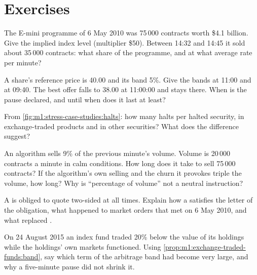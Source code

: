 \section{Exercises}

\begin{exercise}[$\star$]\label{exo:m1:stress-case-studies:1}
The E-mini programme of 6 May 2010 was 75\,000 contracts worth \$4.1 billion.
Give the implied index level (multiplier \$50). Between 14:32 and 14:45 it sold
about 35\,000 contracts: what share of the programme, and at what average
rate per minute?
\end{exercise}

\begin{exercise}[$\star$]\label{exo:m1:stress-case-studies:2}
A share's reference price is 40.00 and its band 5\%. Give the bands at 11:00
and at 09:40. The best offer falls to 38.00 at 11:00:00 and stays there.
When is the pause declared, and until when does it last at least?
\end{exercise}

\begin{exercise}[$\star$]\label{exo:m1:stress-case-studies:3}
From \cref{fig:m1:stress-case-studies:halts}: how many halts per halted
security, in exchange-traded products and in other securities? What does the
difference suggest?
\end{exercise}

\begin{exercise}[$\star\star$]\label{exo:m1:stress-case-studies:4}
An algorithm sells 9\% of the previous minute's volume. Volume is 20\,000
contracts a minute in calm conditions. How long does it take to sell 75\,000
contracts? If the algorithm's own selling and the churn it provokes triple
the volume, how long? Why is ``percentage of volume'' not a neutral
instruction?
\end{exercise}

\begin{exercise}[$\star\star$]\label{exo:m1:stress-case-studies:5}
A  is obliged to quote two-sided at all times. Explain how a  satisfies the letter of the obligation, what happened to market orders
that met  on 6 May 2010, and what replaced .
\end{exercise}

\begin{exercise}[$\star\star$]\label{exo:m1:stress-case-studies:6}
On 24 August 2015 an index fund traded 20\% below the value of its holdings
while the holdings' own markets functioned. Using
\cref{prop:m1:exchange-traded-funds:band}, say which term of the arbitrage
band had become very large, and why a five-minute pause did not shrink it.
\end{exercise}

